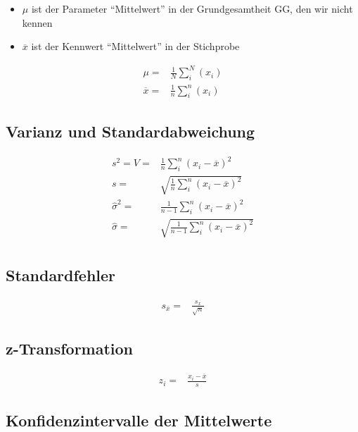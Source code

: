 \documentclass[
  10pt,
  letterpaper,
  a4paper, twoside]{scrreprt}
\providecommand{\tightlist}{%
  \setlength{\itemsep}{0pt}\setlength{\parskip}{0pt}}\usepackage{longtable,booktabs,array}
\begin{document}
\begin{itemize}
\tightlist
\item
  \(\mu\) ist der Parameter \enquote{Mittelwert} in der Grundgesamtheit
  GG, den wir nicht kennen
\item
  \(\overline{x}\) ist der Kennwert \enquote{Mittelwert} in der
  Stichprobe
\end{itemize}

\begin{align}    
 \mu = & \frac{1}{N}\sum_i^N(x_i) \\
 \overline{x} = & \frac{1}{n}\sum_i^n(x_i) 
\end{align}

\subsection*{Varianz und
Standardabweichung}\label{varianz-und-standardabweichung}

\begin{align}    
    s^2 = V = & \frac{1}{n} \sum_i^n(x_i-\overline{x})^2 \\    
    s  = & \sqrt{\frac{1}{n} \sum_i^n(x_i-\overline{x})^2}\\
    \hat{\sigma}^2 = & \frac{1}{n-1} \sum_i^n(x_i-\overline{x})^2\\
    \hat{\sigma} = & \sqrt{\frac{1}{n-1} \sum_i^n(x_i-\overline{x})^2}\\
\end{align}

\subsection*{Standardfehler}\label{standardfehler}

\begin{align}
s_{\bar{x}} = & \frac{s_x}{\sqrt{n}}
\end{align}

\subsection*{z-Transformation}\label{z-transformation-1}

\begin{align}    
      z_i= &\frac{x_i-\overline{x}}{s} \label{eq:z-Transformation} 
\end{align}

\subsection*{Konfidenzintervalle der
Mittelwerte}\label{konfidenzintervalle-der-mittelwerte}
\end{document}
